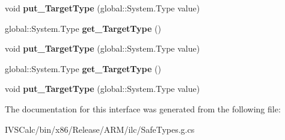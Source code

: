 \begin{DoxyCompactItemize}
\mbox{\label{interface_windows_1_1_u_i_1_1_xaml_1_1_controls_1_1_i_control_template_a43b448ca845289c893fdacf44454c7d0}} 
void {\bfseries put\+\_\+\+Target\+Type} (global\+::\+System.\+Type value)
\item 
\mbox{\label{interface_windows_1_1_u_i_1_1_xaml_1_1_controls_1_1_i_control_template_a91bdae7b666d0884f604ad219c80cd89}} 
global\+::\+System.\+Type {\bfseries get\+\_\+\+Target\+Type} ()
\item 
\mbox{\label{interface_windows_1_1_u_i_1_1_xaml_1_1_controls_1_1_i_control_template_a43b448ca845289c893fdacf44454c7d0}} 
void {\bfseries put\+\_\+\+Target\+Type} (global\+::\+System.\+Type value)
\item 
\mbox{\label{interface_windows_1_1_u_i_1_1_xaml_1_1_controls_1_1_i_control_template_a91bdae7b666d0884f604ad219c80cd89}} 
global\+::\+System.\+Type {\bfseries get\+\_\+\+Target\+Type} ()
\item 
\mbox{\label{interface_windows_1_1_u_i_1_1_xaml_1_1_controls_1_1_i_control_template_a43b448ca845289c893fdacf44454c7d0}} 
void {\bfseries put\+\_\+\+Target\+Type} (global\+::\+System.\+Type value)
\end{DoxyCompactItemize}


The documentation for this interface was generated from the following file\+:\begin{DoxyCompactItemize}
\item 
I\+V\+S\+Calc/bin/x86/\+Release/\+A\+R\+M/ilc/Safe\+Types.\+g.\+cs\end{DoxyCompactItemize}
